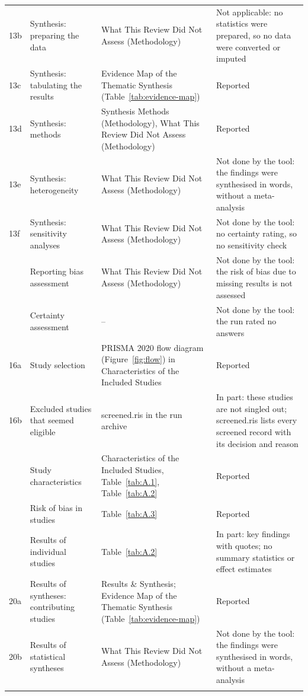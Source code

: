 \documentclass[10pt,a4paper]{article}
\begin{document}
\begin{tabularx}{\textwidth}{l >{\hsize}Y >{\hsize}Y >{\hsize}Y}
13b & Synthesis: preparing the data & What This Review Did Not Assess (Methodology) & Not applicable: no statistics were prepared, so no data were converted or imputed\\ \addlinespace
13c & Synthesis: tabulating the results & Evidence Map of the Thematic Synthesis (Table~\ref{tab:evidence-map}) & Reported\\ \addlinespace
13d & Synthesis: methods & Synthesis Methods (Methodology), What This Review Did Not Assess (Methodology) & Reported\\ \addlinespace
13e & Synthesis: heterogeneity & What This Review Did Not Assess (Methodology) & Not done by the tool: the findings were synthesised in words, without a meta-analysis\\ \addlinespace
13f & Synthesis: sensitivity analyses & What This Review Did Not Assess (Methodology) & Not done by the tool: no certainty rating, so no sensitivity check\\  & Reporting bias assessment & What This Review Did Not Assess (Methodology) & Not done by the tool: the risk of bias due to missing results is not assessed\\  & Certainty assessment & -- & Not done by the tool: the run rated no answers\\ \addlinespace
16a & Study selection & PRISMA 2020 flow diagram (Figure~\ref{fig:flow}) in Characteristics of the Included Studies & Reported\\ \addlinespace
16b & Excluded studies that seemed eligible & screened.ris in the run archive & In part: these studies are not singled out; screened.ris lists every screened record with its decision and reason\\  & Study characteristics & Characteristics of the Included Studies, Table~\ref{tab:A.1}, Table~\ref{tab:A.2} & Reported\\  & Risk of bias in studies & Table~\ref{tab:A.3} & Reported\\  & Results of individual studies & Table~\ref{tab:A.2} & In part: key findings with quotes; no summary statistics or effect estimates\\ \addlinespace
20a & Results of syntheses: contributing studies & Results \& Synthesis; Evidence Map of the Thematic Synthesis (Table~\ref{tab:evidence-map}) & Reported\\ \addlinespace
20b & Results of statistical syntheses & What This Review Did Not Assess (Methodology) & Not done by the tool: the findings were synthesised in words, without a meta-analysis\\ \addlinespace

\end{tabularx}
\end{document}
